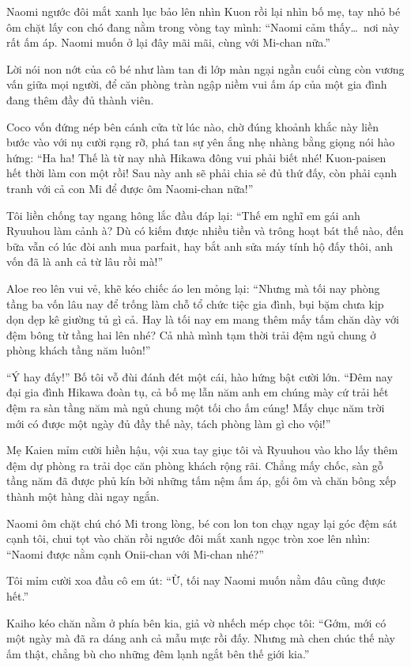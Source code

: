 ﻿\documentclass[../main.tex]{subfiles}
\begin{document}
Naomi ngước đôi mắt xanh lục bảo lên nhìn Kuon rồi lại nhìn bố mẹ, tay nhỏ bé ôm chặt lấy con chó đang nằm trong vòng tay mình: ``Naomi cảm thấy\dots\ nơi này rất ấm áp. Naomi muốn ở lại đây mãi mãi, cùng với Mi-chan nữa.''

Lời nói non nớt của cô bé như làm tan đi lớp màn ngại ngần cuối cùng còn vương vấn giữa mọi người, để căn phòng tràn ngập niềm vui ấm áp của một gia đình đang thêm đầy đủ thành viên.

Coco vốn đứng nép bên cánh cửa từ lúc nào, chờ đúng khoảnh khắc này liền bước vào với nụ cười rạng rỡ, phá tan sự yên ắng nhẹ nhàng bằng giọng nói hào hứng: ``Ha ha! Thế là từ nay nhà Hikawa đông vui phải biết nhé! Kuon-paisen hết thời làm con một rồi! Sau này anh sẽ phải chia sẻ đủ thứ đấy, còn phải cạnh tranh với cả con Mi để được ôm Naomi-chan nữa!''

Tôi liền chống tay ngang hông lắc đầu đáp lại: ``Thế em nghĩ em gái anh Ryuuhou làm cảnh à? Dù có kiếm được nhiều tiền và trông hoạt bát thế nào, đến bữa vẫn có lúc đòi anh mua parfait, hay bắt anh sửa máy tính hộ đấy thôi, anh vốn đã là anh cả từ lâu rồi mà!''

Aloe reo lên vui vẻ, khẽ kéo chiếc áo len mỏng lại: ``Nhưng mà tối nay phòng tầng ba vốn lâu nay để trống làm chỗ tổ chức tiệc gia đình, bụi bặm chưa kịp dọn dẹp kê giường tủ gì cả. Hay là tối nay em mang thêm mấy tấm chăn dày với đệm bông từ tầng hai lên nhé? Cả nhà mình tạm thời trải đệm ngủ chung ở phòng khách tầng năm luôn!''

``Ý hay đấy!'' Bố tôi vỗ đùi đánh đét một cái, hào hứng bật cười lớn. ``Đêm nay đại gia đình Hikawa đoàn tụ, cả bố mẹ lẫn năm anh em chúng mày cứ trải hết đệm ra sàn tầng năm mà ngủ chung một tối cho ấm cúng! Mấy chục năm trời mới có được một ngày đủ đầy thế này, tách phòng làm gì cho vội!''

Mẹ Kaien mỉm cười hiền hậu, vội xua tay giục tôi và Ryuuhou vào kho lấy thêm đệm dự phòng ra trải dọc căn phòng khách rộng rãi. Chẳng mấy chốc, sàn gỗ tầng năm đã được phủ kín bởi những tấm nệm ấm áp, gối ôm và chăn bông xếp thành một hàng dài ngay ngắn.

Naomi ôm chặt chú chó Mi trong lòng, bé con lon ton chạy ngay lại góc đệm sát cạnh tôi, chui tọt vào chăn rồi ngước đôi mắt xanh ngọc tròn xoe lên nhìn: ``Naomi được nằm cạnh Onii-chan với Mi-chan nhé?''

Tôi mỉm cười xoa đầu cô em út: ``Ừ, tối nay Naomi muốn nằm đâu cũng được hết.''

Kaiho kéo chăn nằm ở phía bên kia, giả vờ nhếch mép chọc tôi: ``Gớm, mới có một ngày mà đã ra dáng anh cả mẫu mực rồi đấy. Nhưng mà chen chúc thế này ấm thật, chẳng bù cho những đêm lạnh ngắt bên thế giới kia.''
\end{document}
